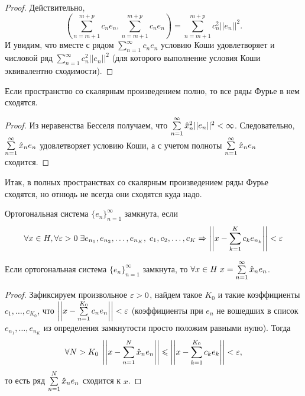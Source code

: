 \begin{proof}

Действительно,
$$
\left(\sum\limits_{n=m+1}^{m+p}c_ne_n, \sum\limits_{n=m+1}^{m+p}c_ne_n\right) =  \sum\limits_{n=m+1}^{m+p}c_n^2 ||e_n||^2.
$$
И увидим, что вместе с рядом $\sum\limits_{n=1}^{\infty} c_n e_n$  условию Коши удовлетворяет и числовой ряд $\sum\limits_{n=1}^{\infty}c_n^2||e_n||^2$ (для которого выполнение условия Коши эквивалентно сходимости).
\end{proof}
\begin{Consequence}
    Если пространство со скалярным произведением полно, то все ряды Фурье в нем сходятся.
\end{Consequence}
\begin{proof}
    Из неравенства Бесселя получаем, что
    $\sum\limits_{n=1}^{\infty} \hat{x}_n^2 ||e_n||^2 < \infty$. Следовательно, $ \sum\limits_{n=1}^{\infty} \hat{x}_ne_n 
    $ удовлетворяет условию Коши, а с учетом полноты $\sum\limits_{n=1}^{\infty}\hat{x}_n e_n$ сходится.
\end{proof}
Итак, в полных пространствах со скалярным произведением ряды Фурье сходятся, но отнюдь не всегда они сходятся куда надо.
\begin{Def}
    Ортогональная система $\{e_n\}_{n=1}^{\infty}$ замкнута, если 
    $$\forall x\in H, \forall \varepsilon >0\; \exists e_{n_1}, e_{n_2}, \ldots, e_{n_K},\; c_1, c_2, \ldots, c_K \Rightarrow \left|\left|x - \sum\limits_{k=1}^{K} c_k e_{n_k}\right|\right|<\varepsilon
    $$
\end{Def}

\begin{Statement}
    Если ортогональная система $\{e_n\}_{n=1}^{\infty}$ замкнута, то $\forall x\in H\; x = \sum\limits_{n=1}^{\infty}\hat{x}_n e_{n}$.
\end{Statement}
\begin{proof}
    Зафиксируем произвольное $\varepsilon >0$, найдем такое $K_0$ и такие коэффициенты $c_1, \ldots, c_{K_0}$, что $\left|\left| x - \sum\limits_{n=1}^{K_0} c_ne_n \right|\right| < \varepsilon$ (коэффициенты при $e_n$ не вошедших в список $ e_{n_1}, \ldots, e_{n_K}$ из определения замкнутости просто положим равными нулю). Тогда
    $$
        \forall N>K_0 \; \left|\left|x - \sum\limits_{n=1}^{N}\hat{x}_ne_n\right|\right|\leqslant \left|\left|x - \sum\limits_{k=1}^{K_0}c_ke_k \right|\right| < \varepsilon,
    $$
    то есть ряд $\sum\limits_{n=1}^{N}\hat{x}_ne_n$ сходится к $x$.
\end{proof}
